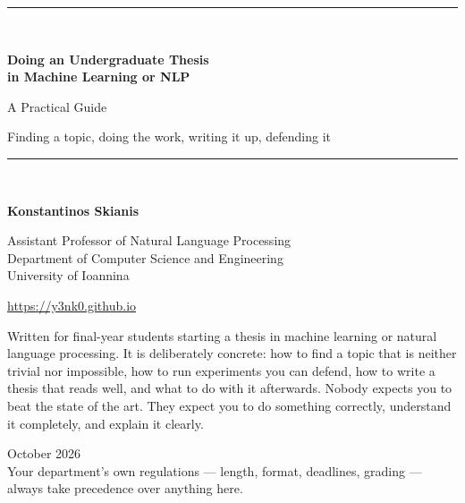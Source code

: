 \documentclass[11pt,a4paper]{article}
\begin{document}
\begin{titlepage}
\centering
\vspace*{2.0cm}
{\color{brandlight}\rule{\textwidth}{2pt}}\\[0.8cm]
{\Huge\bfseries\color{brand} Doing an Undergraduate Thesis\\[0.25cm] in Machine Learning or NLP\par}
\vspace{0.7cm}
{\LARGE\color{ink} A Practical Guide\par}
\vspace{0.5cm}
{\large\color{mutegray} Finding a topic, doing the work, writing it up, defending it\par}
\vspace{0.6cm}
{\color{brandlight}\rule{\textwidth}{2pt}}\\[1.1cm]

{\large\bfseries\color{ink} Konstantinos Skianis\par}
\vspace{0.18cm}
{\normalsize\color{mutegray} Assistant Professor of Natural Language Processing\\[2pt]
Department of Computer Science and Engineering\\[2pt]
University of Ioannina\par}
\vspace{0.25cm}
{\footnotesize\color{brandlight}\url{https://y3nk0.github.io}\par}
\vspace{1.1cm}

\begin{minipage}{0.85\textwidth}
\small\color{ink}
Written for final-year students starting a thesis in machine learning or
natural language processing. It is deliberately concrete: how to find a topic
that is neither trivial nor impossible, how to run experiments you can defend,
how to write a thesis that reads well, and what to do with it afterwards.
Nobody expects you to beat the state of the art. They expect you to do
something correctly, understand it completely, and explain it clearly.
\end{minipage}

\vfill
{\color{mutegray} October 2026}\\[0.3cm]
{\footnotesize\color{mutegray} Your department's own regulations --- length,
format, deadlines, grading --- always take precedence over anything here.}
\end{titlepage}
\end{document}
